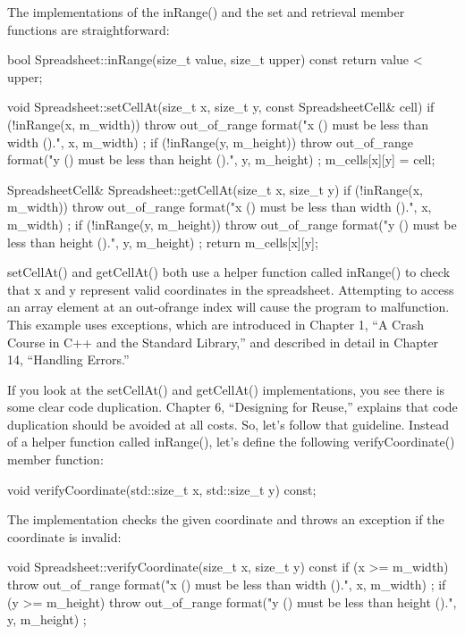 The implementations of the inRange() and the set and retrieval member functions are straightforward:

\begin{cpp}
bool Spreadsheet::inRange(size_t value, size_t upper) const
{
    return value < upper;
}

void Spreadsheet::setCellAt(size_t x, size_t y, const SpreadsheetCell& cell)
{
    if (!inRange(x, m_width)) {
        throw out_of_range {
            format("x ({}) must be less than width ({}).", x, m_width) };
    }
    if (!inRange(y, m_height)) {
        throw out_of_range {
            format("y ({}) must be less than height ({}).", y, m_height) };
    }
    m_cells[x][y] = cell;
}

SpreadsheetCell& Spreadsheet::getCellAt(size_t x, size_t y)
{
    if (!inRange(x, m_width)) {
        throw out_of_range {
            format("x ({}) must be less than width ({}).", x, m_width) };
    }
    if (!inRange(y, m_height)) {
        throw out_of_range {
            format("y ({}) must be less than height ({}).", y, m_height) };
    }
    return m_cells[x][y];
}
\end{cpp}


setCellAt() and getCellAt() both use a helper function called inRange() to check that x and y represent valid coordinates in the spreadsheet. Attempting to access an array element at an out-ofrange index will cause the program to malfunction. This example uses exceptions, which are introduced in Chapter 1, “A Crash Course in C++ and the Standard Library,” and described in detail in Chapter 14, “Handling Errors.”

If you look at the setCellAt() and getCellAt() implementations, you see there is some clear code duplication. Chapter 6, “Designing for Reuse,” explains that code duplication should be avoided at all costs. So, let’s follow that guideline. Instead of a helper function called inRange(), let’s define the following verifyCoordinate() member function:

\begin{cpp}
void verifyCoordinate(std::size_t x, std::size_t y) const;
\end{cpp}

The implementation checks the given coordinate and throws an exception if the coordinate is invalid:

\begin{cpp}
void Spreadsheet::verifyCoordinate(size_t x, size_t y) const
{
    if (x >= m_width) {
        throw out_of_range {
            format("x ({}) must be less than width ({}).", x, m_width) };
    }
    if (y >= m_height) {
        throw out_of_range {
            format("y ({}) must be less than height ({}).", y, m_height) };
    }
}
\end{cpp}


